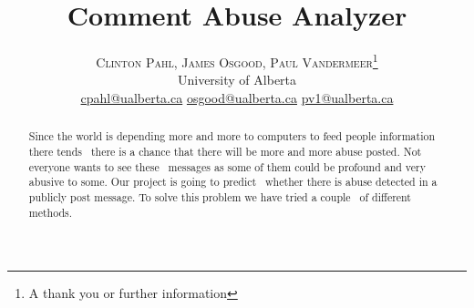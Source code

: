 \documentclass[twoside]{article}
\title{\vspace{-15mm}\fontsize{24pt}{10pt}\selectfont\textbf{Comment Abuse Analyzer}} %
\author{
\large
\textsc{Clinton Pahl, James Osgood, Paul Vandermeer}\thanks{A thank you or further information}\\[2mm] %
\normalsize University of Alberta \\ %
\normalsize \href{mailto:cpahl@ualberta.ca}{cpahl@ualberta.ca} %
\normalsize \href{mailto:osgood@ualberta.ca}{osgood@ualberta.ca} %
\normalsize \href{mailto:pv1@ualberta.ca}{pv1@ualberta.ca} %
\vspace{-5mm}
}
\date{}
\begin{document}
\maketitle %

\thispagestyle{fancy} %


\begin{abstract}

\noindent
Since the world is depending more and more to computers to feed people information there tends \
there is a chance that there will be more and more abuse posted.  Not everyone wants to see these \
messages as some of them could be profound and very abusive to some.  Our project is going to predict \
whether there is abuse detected in a publicly post message.  To solve this problem we have tried a couple \
of different methods.


\end{abstract}

\end{document}
